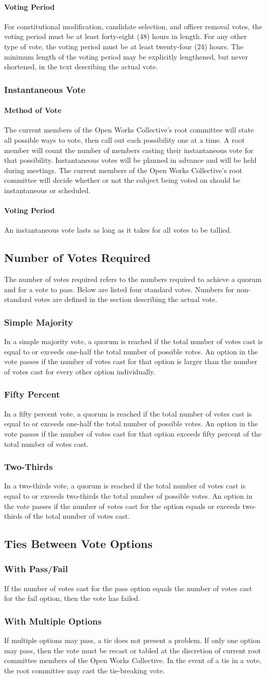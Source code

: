 \documentclass{article}
\newcommand{\asection}[1]{\subsection{#1} \label{#1}}
\newcommand{\asubsection}[1]{\subsubsection{#1} \label{#1}}
\newcommand{\asubsubsection}[1]{\paragraph{#1} \label{#1}}
\begin{document}
\asubsubsection{Voting Period}
For constitutional modification, candidate selection, and officer removal votes, the voting period must be at least forty-eight (48) hours in length.
For any other type of vote, the voting period must be at least twenty-four (24) hours.
The minimum length of the voting period may be explicitly lengthened, but never shortened, in the text describing the actual vote.
\asubsection{Instantaneous Vote}
\asubsubsection{Method of Vote}
The current members of the Open Works Collective's root committee will state all possible ways to vote, then call out each possibility one at a time.
A root member will count the number of members casting their instantaneous vote for that possibility. Instantaneous votes will be planned in advance and will be held during meetings. The current members of the Open Works Collective's root committee will decide whether or not the subject being voted on should be instantaneous or scheduled.
\asubsubsection{Voting Period}
An instantaneous vote lasts as long as it takes for all votes to be tallied.

\asection{Number of Votes Required}
The number of votes required refers to the numbers required to achieve a quorum and for a vote to pass.
Below are listed four standard votes.
Numbers for non-standard votes are defined in the section describing the actual vote.
\asubsection{Simple Majority}
In a simple majority vote, a quorum is reached if the total number of votes cast is equal to or exceeds one-half the total number of possible votes.
An option in the vote passes if the number of votes cast for that option is larger than the number of votes cast for every other option individually.
\asubsection{Fifty Percent}
In a fifty percent vote, a quorum is reached if the total number of votes cast is equal to or exceeds one-half the total number of possible votes.
An option in the vote passes if the number of votes cast for that option exceeds fifty percent of the total number of votes cast.
\asubsection{Two-Thirds}
In a two-thirds vote, a quorum is reached if the total number of votes cast is equal to or exceeds two-thirds the total number of possible votes.
An option in the vote passes if the number of votes cast for the option equals or exceeds two-thirds of the total number of votes cast.

\asection{Ties Between Vote Options}
\asubsection{With Pass/Fail}
If the number of votes cast for the pass option equals the number of votes cast for the fail option, then the vote has failed.
\asubsection{With Multiple Options}
If multiple options may pass, a tie does not present a problem.
If only one option may pass, then the vote must be recast or tabled at the discretion of current root committee members of the Open Works Collective.
In the event of a tie in a vote, the root committee may cast the tie-breaking vote.
\end{document}
